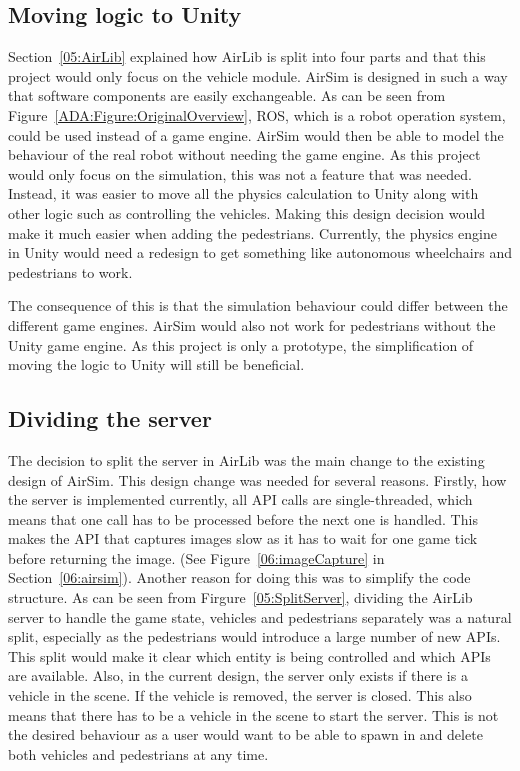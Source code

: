 \subsection{Moving logic to Unity}
Section~\ref{05:AirLib} explained how AirLib is split into four parts and that this project would only focus on the vehicle module. AirSim is designed in such a way that software components are easily exchangeable. As can be seen from Figure~\ref{ADA:Figure:OriginalOverview}, ROS, which is a robot operation system, could be used instead of a game engine. AirSim would then be able to model the behaviour of the real robot without needing the game engine. As this project would only focus on the simulation, this was not a feature that was needed. Instead, it was easier to move all the physics calculation to Unity along with other logic such as controlling the vehicles. Making this design decision would make it much easier when adding the pedestrians. Currently, the physics engine in Unity would need a redesign to get something like autonomous wheelchairs and pedestrians to work.

The consequence of this is that the simulation behaviour could differ between the different game engines. AirSim would also not work for pedestrians without the Unity game engine. As this project is only a prototype, the simplification of moving the logic to Unity will still be beneficial. 

\subsection{Dividing the server}
The decision to split the server in AirLib was the main change to the existing design of AirSim. This design change was needed for several reasons. Firstly, how the server is implemented currently, all API calls are single-threaded, which means that one call has to be processed before the next one is handled. This makes the API that captures images slow as it has to wait for one game tick before returning the image. (See Figure~\ref{06:imageCapture} in Section~\ref{06:airsim}). Another reason for doing this was to simplify the code structure. As can be seen from Firgure~\ref{05:SplitServer}, dividing the AirLib server to handle the game state, vehicles and pedestrians separately was a natural split, especially as the pedestrians would introduce a large number of new APIs. This split would make it clear which entity is being controlled and which APIs are available. Also, in the current design, the server only exists if there is a vehicle in the scene. If the vehicle is removed, the server is closed. This also means that there has to be a vehicle in the scene to start the server.  This is not the desired behaviour as a user would want to be able to spawn in and delete both vehicles and pedestrians at any time. 

